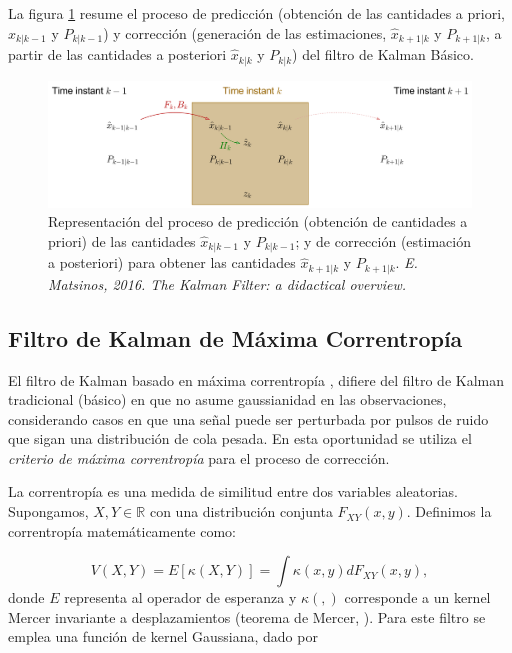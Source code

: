 La figura \ref{fig:kfb} resume el proceso de predicci\'on (obtenci\'on de las cantidades a priori, $\hat{x}_{k|k-1}$ y $P_{k|k-1}$) y correcci\'on (generaci\'on de las estimaciones, $\hat{x}_{k+1|k}$ y $P_{k+1|k}$, a partir de las cantidades a posteriori  $\hat{x}_{k|k}$ y $P_{k|k}$) del filtro de Kalman B\'asico. 
\begin{figure}[h!]
\centering
\includegraphics[scale=0.5]{images/kfb}
\caption{Representaci\'on del proceso de predicci\'on (obtenci\'on de cantidades a priori) de las cantidades $\hat{x}_{k|k-1}$ y $P_{k|k-1}$;  y de correcci\'on (estimaci\'on a posteriori) para obtener las cantidades $\hat{x}_{k+1|k}$ y $P_{k+1|k}$. \textit{E. Matsinos, 2016. The Kalman Filter: a didactical overview.}}
\label{fig:kfb}
\end{figure}

\subsection{Filtro de Kalman de M\'axima Correntrop\'ia}

El filtro de Kalman basado en m\'axima correntrop\'ia \cite{badong}, difiere del filtro de Kalman tradicional (b\'asico) en que no asume gaussianidad en las observaciones, considerando casos en que una se\~nal puede ser perturbada por pulsos de ruido que sigan una distribuci\'on de cola pesada. En esta oportunidad se utiliza el \textit{criterio de m\'axima correntrop\'ia} para el proceso de correcci\'on. 
\bigskip

La correntrop\'ia es una medida de similitud entre dos variables aleatorias. Supongamos, $X,Y \in \mathbb{R}$ con una distribuci\'on conjunta $F_{XY} (x,y)$. Definimos la correntrop\'ia matem\'aticamente como:

\begin{equation}
V(X,Y) = E[\kappa(X,Y)] = \int \kappa(x,y) dF_{XY} (x,y),
\label{eq:eqcorr}
\end{equation}
\noindent
donde $E$ representa al operador de esperanza y $\kappa(,)$ corresponde a un kernel Mercer invariante a desplazamientos (teorema de Mercer, \cite{mercer}). Para este filtro se emplea una funci\'on de kernel Gaussiana, dado por

